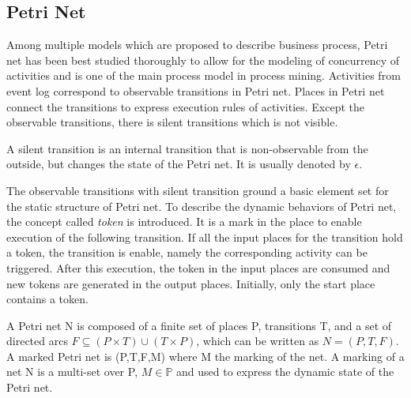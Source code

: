 \subsection{Petri Net}
Among multiple models which are proposed to describe business process, Petri net has been best studied thoroughly to allow for the modeling of concurrency of activities and is one of the main process model in process mining. Activities from event log correspond to observable transitions in Petri net. Places in Petri net connect the transitions to express execution rules of activities. Except the observable transitions, there is silent transitions which is not visible. 
\begin{definition}
	A silent transition is an internal transition that is non-observable from the outside, but changes the state of the Petri net. It is usually denoted by $\epsilon$.  
\end{definition}
The observable transitions with silent transition ground a basic element set for the static structure of Petri net. To describe the dynamic behaviors of Petri net, the concept called \emph{token} is introduced. It is a mark in the place to enable execution of the following transition. If all the input places for the transition hold a token, the transition is enable, namely  the corresponding activity can be triggered. After this execution, the token in the input places are consumed and new tokens are generated in the output places. Initially, only the start place contains a token. 
\begin{definition}
	A Petri net N is composed of a finite set of places P, transitions T, and a set of directed arcs $F \subseteq (P \times T) \cup (T \times P)$, which can be written as $N=(P,T,F)$. A marked Petri net is (P,T,F,M) where M the marking of the net. A marking of a net N is a multi-set over P, $M \in \mathbb{P} $ and used to express the dynamic state of the Petri net.
\end{definition}

